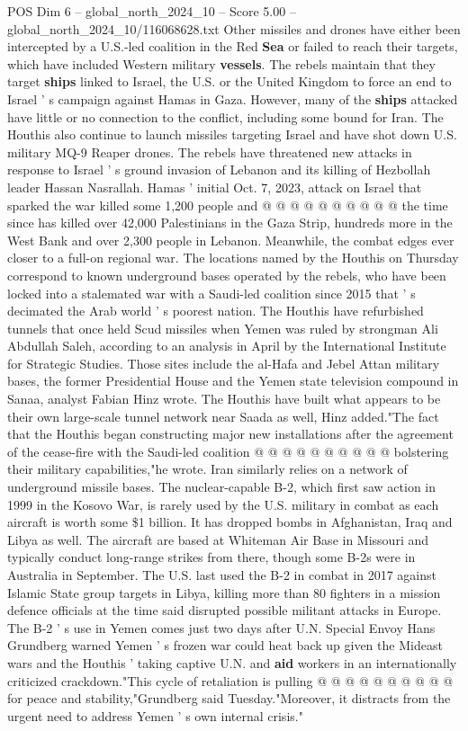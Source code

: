 \begin{textsample}{POS Dim 6 – global\_north\_2024\_10 – Score 5.00 – global\_north\_2024\_10/116068628.txt}
Other missiles and drones have either been intercepted by a U.S.-led coalition in the Red \textbf{Sea} or failed to reach their targets, which have included Western military \textbf{vessels}.
The rebels maintain that they target \textbf{ships} linked to Israel, the U.S. or the United Kingdom to force an end to Israel ' s campaign against Hamas in Gaza.
However, many of the \textbf{ships} attacked have little or no connection to the conflict, including some bound for Iran.
The Houthis also continue to launch missiles targeting Israel and have shot down U.S. military MQ-9 Reaper drones.
The rebels have threatened new attacks in response to Israel ' s ground invasion of Lebanon and its killing of Hezbollah leader Hassan Nasrallah.
Hamas ' initial Oct. 7, 2023, attack on Israel that sparked the war killed some 1,200 people and @ @ @ @ @ @ @ @ @ @ the time since has killed over 42,000 Palestinians in the Gaza Strip, hundreds more in the West Bank and over 2,300 people in Lebanon.
Meanwhile, the combat edges ever closer to a full-on regional war.
The locations named by the Houthis on Thursday correspond to known underground bases operated by the rebels, who have been locked into a stalemated war with a Saudi-led coalition since 2015 that ' s decimated the Arab world ' s poorest nation.
The Houthis have refurbished tunnels that once held Scud missiles when Yemen was ruled by strongman Ali Abdullah Saleh, according to an analysis in April by the International Institute for Strategic Studies.
Those sites include the al-Hafa and Jebel Attan military bases, the former Presidential House and the Yemen state television compound in Sanaa, analyst Fabian Hinz wrote.
The Houthis have built what appears to be their own large-scale tunnel network near Saada as well, Hinz added."The fact that the Houthis began constructing major new installations after the agreement of the cease-fire with the Saudi-led coalition @ @ @ @ @ @ @ @ @ @ bolstering their military capabilities,"he wrote.
Iran similarly relies on a network of underground missile bases.
The nuclear-capable B-2, which first saw action in 1999 in the Kosovo War, is rarely used by the U.S. military in combat as each aircraft is worth some \$1 billion.
It has dropped bombs in Afghanistan, Iraq and Libya as well.
The aircraft are based at Whiteman Air Base in Missouri and typically conduct long-range strikes from there, though some B-2s were in Australia in September.
The U.S. last used the B-2 in combat in 2017 against Islamic State group targets in Libya, killing more than 80 fighters in a mission defence officials at the time said disrupted possible militant attacks in Europe.
The B-2 ' s use in Yemen comes just two days after U.N.
Special Envoy Hans Grundberg warned Yemen ' s frozen war could heat back up given the Mideast wars and the Houthis ' taking captive U.N. and \textbf{aid} workers in an internationally criticized crackdown."This cycle of retaliation is pulling @ @ @ @ @ @ @ @ @ @ for peace and stability,"Grundberg said Tuesday."Moreover, it distracts from the urgent need to address Yemen ' s own internal crisis."

\end{textsample}
